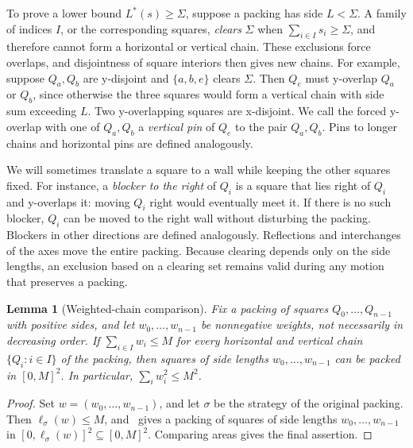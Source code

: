 \documentclass[12pt]{amsart}
\newtheorem{lemma}[theorem]{Lemma}
\theoremstyle{definition}
\theoremstyle{remark}
\numberwithin{equation}{section}
\numberwithin{figure}{section}
\numberwithin{table}{section}
\begin{document}
To prove a lower bound $L^*(s)\ge\Sigma$, suppose a packing has side
$L<\Sigma$. A family of indices $I$, or the corresponding squares,
\emph{clears} $\Sigma$ when $\sum_{i\in I}s_i\ge\Sigma$, and therefore
cannot form a horizontal or vertical chain.
These exclusions force overlaps, and disjointness of square interiors
then gives new chains. For example, suppose $Q_a,Q_b$ are y-disjoint and $\{a,b,e\}$ clears $\Sigma$.
Then $Q_e$ must y-overlap $Q_a$ or $Q_b$, since otherwise the three
squares would form a vertical chain with side sum exceeding $L$.
Two y-overlapping squares are x-disjoint. We call the
forced y-overlap with one of $Q_a,Q_b$ a \emph{vertical pin} of $Q_e$
to the pair $Q_a,Q_b$. Pins to longer chains and horizontal pins are
defined analogously.

We will sometimes translate a square to a wall while keeping the other
squares fixed. For instance, a \emph{blocker to the right} of $Q_i$
is a square that lies right of $Q_i$ and y-overlaps it: moving $Q_i$ right
would eventually meet it. If there is no
such blocker, $Q_i$ can be moved to the right wall without disturbing
the packing. Blockers in other directions are defined analogously.
Reflections and interchanges of the axes move the entire packing.
Because clearing depends only on the side lengths, an exclusion based
on a clearing set remains valid during any motion that preserves a packing.

\begin{lemma}[Weighted-chain comparison]\label{lem:weighted}
Fix a packing of squares $Q_0,\ldots,Q_{n-1}$ with positive sides, and let
$w_0,\ldots,w_{n-1}$ be nonnegative weights, not necessarily in decreasing
order. If $\sum_{i\in I}w_i\le M$ for every horizontal and vertical chain
$\{Q_i:i\in I\}$ of the packing, then squares of side lengths
$w_0,\ldots,w_{n-1}$ can be packed in $[0,M]^2$. In particular,
$\sum_iw_i^2\le M^2$.
\end{lemma}
\begin{proof}
Set $w=(w_0,\ldots,w_{n-1})$, and let $\sigma$ be the strategy of the original
packing. Then $\ell_\sigma(w)\le M$, and~\cite[Lemma~2.4]{BadgerSeven} gives a
packing of squares of side lengths $w_0,\ldots,w_{n-1}$ in
$[0,\ell_\sigma(w)]^2\subseteq[0,M]^2$. Comparing areas gives the final
assertion.
\end{proof}
\end{document}
